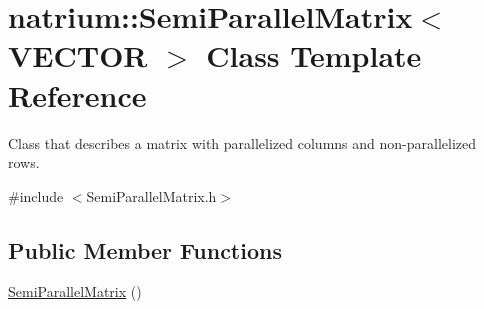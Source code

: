 \hypertarget{classnatrium_1_1SemiParallelMatrix}{
\section{natrium::SemiParallelMatrix$<$ VECTOR $>$ Class Template Reference}
\label{classnatrium_1_1SemiParallelMatrix}
}


Class that describes a matrix with parallelized columns and non-\/parallelized rows.  


{\ttfamily \#include $<$SemiParallelMatrix.h$>$}\subsection*{Public Member Functions}
\begin{DoxyCompactItemize}
\item 
\hypertarget{classnatrium_1_1SemiParallelMatrix_a0599a2569143e3c5c4674f9d0ebf7dd8}{
\hyperlink{classnatrium_1_1SemiParallelMatrix_a0599a2569143e3c5c4674f9d0ebf7dd8}{SemiParallelMatrix} ()}
\label{classnatrium_1_1SemiParallelMatrix_a0599a2569143e3c5c4674f9d0ebf7dd8}


\end{DoxyCompactItemize}
